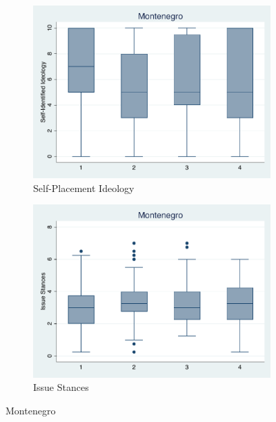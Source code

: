 \documentclass[12pt, titlepage]{article}
\begin{document}
\begin{figure}[H]
	\centering
	\begin{subfigure}[b]{0.475\textwidth}   
		\centering 
		\includegraphics[width=\textwidth]{IdeoBP/Montenegro}
		\caption{Self-Placement Ideology}
	\end{subfigure}
	\hfill
	\begin{subfigure}[b]{0.475\textwidth}
		\centering 
		\includegraphics[width=\textwidth]{BoxLib/Montenegro}
		\caption{Issue Stances}
	\end{subfigure}
	\caption{Montenegro}
	\label{Montenegro}
\end{figure}
\end{document}
